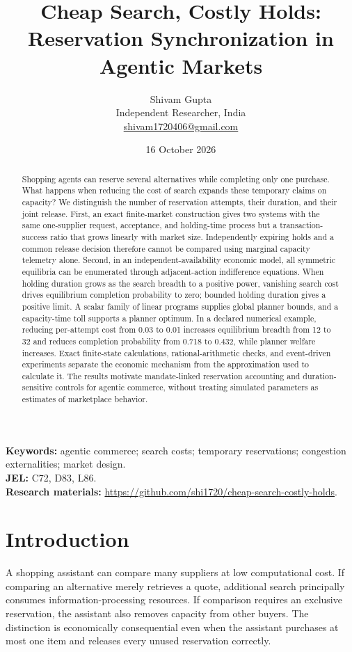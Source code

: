 \documentclass[11pt,a4paper]{article}
\title{\vspace{-12mm}\textbf{Cheap Search, Costly Holds:\\Reservation Synchronization in Agentic Markets}}
\author{Shivam Gupta\\\small Independent Researcher, India\\\small\href{mailto:shivam1720406@gmail.com}{shivam1720406@gmail.com}}
\date{16 October 2026}
\begin{document}
\maketitle
\begin{abstract}
Shopping agents can reserve several alternatives while completing only one purchase. What happens when reducing the cost of search expands these temporary claims on capacity? We distinguish the number of reservation attempts, their duration, and their joint release. First, an exact finite-market construction gives two systems with the same one-supplier request, acceptance, and holding-time process but a transaction-success ratio that grows linearly with market size. Independently expiring holds and a common release decision therefore cannot be compared using marginal capacity telemetry alone. Second, in an independent-availability economic model, all symmetric equilibria can be enumerated through adjacent-action indifference equations. When holding duration grows as the search breadth to a positive power, vanishing search cost drives equilibrium completion probability to zero; bounded holding duration gives a positive limit. A scalar family of linear programs supplies global planner bounds, and a capacity-time toll supports a planner optimum. In a declared numerical example, reducing per-attempt cost from 0.03 to 0.01 increases equilibrium breadth from 12 to 32 and reduces completion probability from 0.718 to 0.432, while planner welfare increases. Exact finite-state calculations, rational-arithmetic checks, and event-driven experiments separate the economic mechanism from the approximation used to calculate it. The results motivate mandate-linked reservation accounting and duration-sensitive controls for agentic commerce, without treating simulated parameters as estimates of marketplace behavior.
\end{abstract}
\noindent\textbf{Keywords:} agentic commerce; search costs; temporary reservations; congestion externalities; market design.\\
\textbf{JEL:} C72, D83, L86.\\
\textbf{Research materials:} \url{https://github.com/shi1720/cheap-search-costly-holds}.

\section{Introduction}
A shopping assistant can compare many suppliers at low computational cost. If comparing an alternative merely retrieves a quote, additional search principally consumes information-processing resources. If comparison requires an exclusive reservation, the assistant also removes capacity from other buyers. The distinction is economically consequential even when the assistant purchases at most one item and releases every unused reservation correctly.
\end{document}
